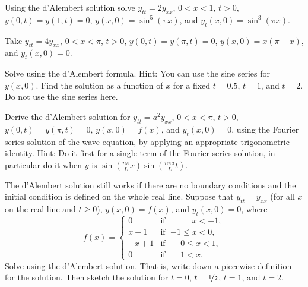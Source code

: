 \begin{exercise}
Using the d'Alembert solution solve $y_{tt} = 2y_{xx}$, $0 < x < 1$, $t > 0$,
$y(0,t) = y(1, t) = 0$, $y(x,0) = \sin^5 (\pi x)$, and
$y_t(x,0) = \sin^3 (\pi x)$.
\end{exercise}

\begin{exercise}
Take
$y_{tt} = 4y_{xx}$, $0 < x < \pi$, $t > 0$,
$y(0,t) = y(\pi, t) = 0$, $y(x,0) = x(\pi-x)$, and
$y_t(x,0) = 0$.
\begin{tasks}
\task Solve using the d'Alembert formula.  Hint: You can use the sine series
for $y(x,0)$.
\task Find the solution as a function of $x$ for a fixed $t=0.5$, $t=1$, and
$t=2$.  Do not use the sine series here.
\end{tasks}
\end{exercise}

\begin{exercise}
Derive the d'Alembert solution for $y_{tt} = a^2 y_{xx}$, $0 < x < \pi$, $t >
0$,
$y(0,t) = y(\pi, t) = 0$, $y(x,0) = f(x)$, and
$y_t(x,0) = 0$, using the Fourier series solution of the wave equation,
by applying an appropriate trigonometric identity.
Hint: Do it first for a single term of the Fourier series solution,
in particular do it when $y$ is
$\sin\left(\frac{n \pi}{L} x \right)\sin\left(\frac{n \pi a}{L} t \right)$.
\end{exercise}

\begin{exercise}
The d'Alembert solution still works if there are no boundary conditions and
the initial condition is defined on the whole real line.  Suppose that
$y_{tt} = y_{xx}$ (for all $x$ on the real line and $t \geq 0$),
$y(x,0) = f(x)$, and
$y_t(x,0) = 0$, where
\begin{equation*}
f(x) =
\begin{cases}
0 & \text{if } \; \phantom{{-1} \leq {} }x < -1, \\
x+1 & \text{if } \; {-1} \leq x < 0, \\
-x+1 & \text{if } \; \phantom{-}0 \leq x < 1, \\
0 & \text{if } \; \phantom{-}1 < x .
\end{cases}
\end{equation*}
Solve using the d'Alembert solution. That is, write down a piecewise
definition for the solution.  Then sketch the solution for $t=0$,
$t=\nicefrac{1}{2}$, $t=1$, and $t=2$.
\end{exercise}

\setcounter{exercise}{100}

